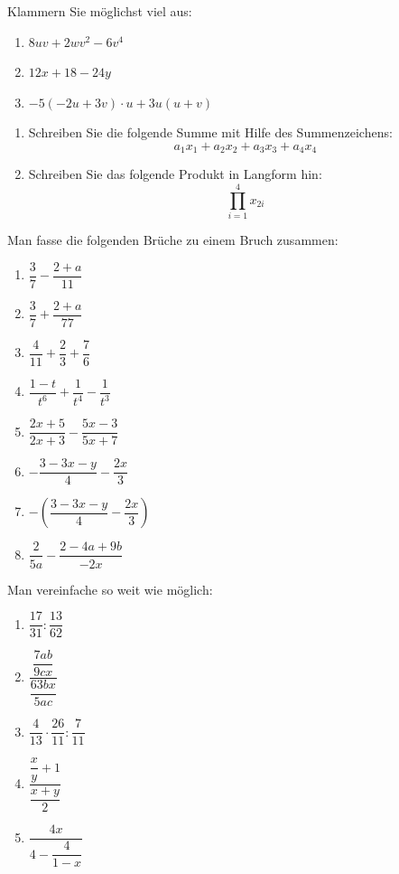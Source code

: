 \begin{uebungsaufgaben}
  \item Klammern Sie möglichst viel aus:
    \begin{enumerate}[label=\alph*)]
      \item $8uv + 2wv^2 - 6v^4$
      \item $12x + 18 - 24y$
      \item $-5(-2u + 3v) \cdot u + 3u(u + v)$
    \end{enumerate}
  \item \begin{enumerate}[label=\alph*)]
      \item Schreiben Sie die folgende Summe mit Hilfe des Summenzeichens: \[ a_1x_1 + a_2x_2 + a_3x_3 + a_4x_4 \]
      \item Schreiben Sie das folgende Produkt in Langform hin: \[ \prod_{i=1}^{4} x_{2i} \]
    \end{enumerate}
  \item Man fasse die folgenden Brüche zu einem Bruch zusammen:
    \begin{enumerate}[label=\alph*)]
      \item $\dfrac{3}{7} - \dfrac{2+a}{11}$
      \item $\dfrac{3}{7} + \dfrac{2+a}{77}$
      \item $\dfrac{4}{11} + \dfrac{2}{3} + \dfrac{7}{6}$
      \item $\dfrac{1-t}{t^6} + \dfrac{1}{t^4} - \dfrac{1}{t^3}$
      \item $\dfrac{2x+5}{2x+3} - \dfrac{5x-3}{5x+7}$
      \item $-\dfrac{3-3x-y}{4} - \dfrac{2x}{3}$
      \item $-\left(\dfrac{3-3x-y}{4} - \dfrac{2x}{3}\right)$
      \item $\dfrac{2}{5a} - \dfrac{2-4a+9b}{-2x}$
    \end{enumerate}
  \item Man vereinfache so weit wie möglich:
    \begin{enumerate}[label=\alph*)]
      \item $\dfrac{17}{31} : \dfrac{13}{62}$
      \item $\dfrac{\dfrac{7ab}{9cx}}{\dfrac{63bx}{5ac}}$
      \item $\dfrac{4}{13} \cdot \dfrac{26}{11} : \dfrac{7}{11}$
      \item $\dfrac{\dfrac{x}{y} + 1}{\dfrac{x+y}{2}}$
      \item $\dfrac{4x}{4 - \dfrac{4}{1-x}}$

\end{enumerate}
\end{uebungsaufgaben}
